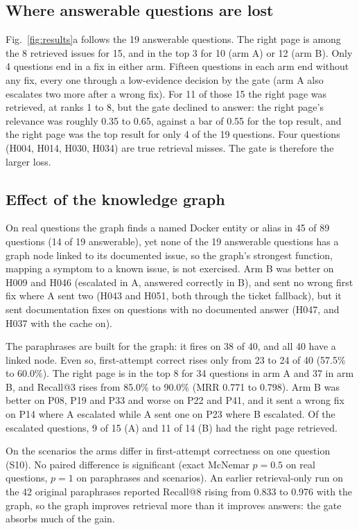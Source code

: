 \documentclass[cameraready]{ieeeconf}
\begin{document}
\subsection{Where answerable questions are lost}
Fig.~\ref{fig:results}a follows the 19 answerable questions. The right page is among the 8 retrieved issues for 15, and in the top 3 for 10 (arm A) or 12 (arm B). Only 4 questions end in a fix in either arm. Fifteen questions in each arm end without any fix, every one through a low-evidence decision by the gate (arm A also escalates two more after a wrong fix). For 11 of those 15 the right page was retrieved, at ranks 1 to 8, but the gate declined to answer: the right page's relevance was roughly 0.35 to 0.65, against a bar of 0.55 for the top result, and the right page was the top result for only 4 of the 19 questions. Four questions (H004, H014, H030, H034) are true retrieval misses. The gate is therefore the larger loss.

\subsection{Effect of the knowledge graph}
On real questions the graph finds a named Docker entity or alias in 45 of 89 questions (14 of 19 answerable), yet none of the 19 answerable questions has a graph node linked to its documented issue, so the graph's strongest function, mapping a symptom to a known issue, is not exercised. Arm B was better on H009 and H046 (escalated in A, answered correctly in B), and sent no wrong first fix where A sent two (H043 and H051, both through the ticket fallback), but it sent documentation fixes on questions with no documented answer (H047, and H037 with the cache on).

The paraphrases are built for the graph: it fires on 38 of 40, and all 40 have a linked node. Even so, first-attempt correct rises only from 23 to 24 of 40 (57.5\% to 60.0\%). The right page is in the top 8 for 34 questions in arm A and 37 in arm B, and Recall@3 rises from 85.0\% to 90.0\% (MRR 0.771 to 0.798). Arm B was better on P08, P19 and P33 and worse on P22 and P41, and it sent a wrong fix on P14 where A escalated while A sent one on P23 where B escalated. Of the escalated questions, 9 of 15 (A) and 11 of 14 (B) had the right page retrieved.

On the scenarios the arms differ in first-attempt correctness on one question (S10). No paired difference is significant (exact McNemar $p=0.5$ on real questions, $p=1$ on paraphrases and scenarios). An earlier retrieval-only run on the 42 original paraphrases reported Recall@8 rising from 0.833 to 0.976 with the graph, so the graph improves retrieval more than it improves answers: the gate absorbs much of the gain.
\end{document}
